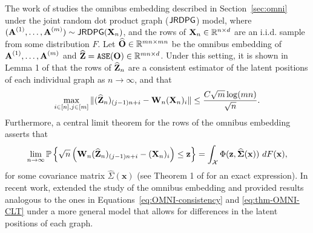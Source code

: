 

The work of \cite{levin2017central} studies the omnibus embedding described in Section~\ref{sec:omni} under the joint random dot product graph ($\operatorname{\mathsf{JRDPG}}$) model, where $(\operatorname{\mathbf{A}}^{(1)}, \ldots, \operatorname{\mathbf{A}}^{(m)})\sim\operatorname{\mathsf{JRDPG}}(\operatorname{\mathbf{X}}_n)$, and the rows of $\operatorname{\mathbf{X}}_n\in\mathbb{R}^{n\times d}$ are an i.i.d. sample from some distribution $F$. Let $\widehat{\mathbf{O}}\in\mathbb{R}^{mn\times mn}$ be the omnibus embedding of $\operatorname{\mathbf{A}}^{(1)}, \ldots, \operatorname{\mathbf{A}}^{(m)}$ and $\widehat{\operatorname{\mathbf{Z}}} = \operatorname{\mathtt{ASE}}(\mathbf{O})\in\mathbb{R}^{mn\times d}$.
Under this setting, it is shown in Lemma 1 of \cite{levin2017central} that the rows of $\widehat{\operatorname{\mathbf{Z}}}_n$ are a consistent estimator of the latent positions of each individual graph  as $n\rightarrow\infty$, and that
\begin{equation}
\max_{i\in[n],j\in[m]}\|(\widehat{\operatorname{\mathbf{Z}}}_n)_{(j-1)n + i} - \operatorname{\mathbf{W}}_n(\operatorname{\mathbf{X}}_n)_{i}\| \leq \frac{C\sqrt{m}\log(mn)}{\sqrt{n}}. \label{eq:OMNI-consistency}    
\end{equation}
Furthermore, a central limit theorem for the rows of the omnibus embedding  asserts that
\begin{equation}
   \lim_{n\rightarrow\infty} \mathbb{P}\left\{\sqrt{n}\left(\operatorname{\mathbf{W}}_n(\widehat{\operatorname{\mathbf{Z}}}_n)_{(j-1)n + i} - (\operatorname{\mathbf{X}}_n)_i\right)\leq \mathbf{z}\right\}  = \int_{\mathcal{X}}\Phi(\mathbf{z}, \widehat{\mathbf{\Sigma}}(\mathbf{x}))\  dF(\mathbf{x}),\label{eq:thm-OMNI-CLT}
\end{equation}
for some covariance matrix $\widehat{\Sigma}(\mathbf{x})$ (see Theorem 1 of \cite{levin2017central} for an exact expression). In recent work, \cite{draves2020bias} extended the study of the omnibus embedding and provided results analogous to the ones in Equations~\eqref{eq:OMNI-consistency} and \eqref{eq:thm-OMNI-CLT} under a more general model that allows for differences in the latent positions of each graph.



